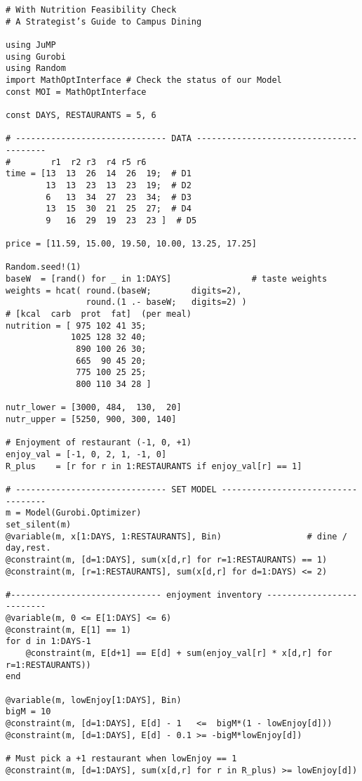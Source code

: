 \fontsize{10}{10}\selectfont

\begin{verbatim}
# With Nutrition Feasibility Check
# A Strategist’s Guide to Campus Dining

using JuMP
using Gurobi
using Random
import MathOptInterface # Check the status of our Model
const MOI = MathOptInterface

const DAYS, RESTAURANTS = 5, 6

# ------------------------------ DATA ----------------------------------------
#        r1  r2 r3  r4 r5 r6
time = [13  13  26  14  26  19;  # D1
        13  13  23  13  23  19;  # D2
        6   13  34  27  23  34;  # D3  
        13  15  30  21  25  27;  # D4
        9   16  29  19  23  23 ]  # D5  

price = [11.59, 15.00, 19.50, 10.00, 13.25, 17.25]

Random.seed!(1)
baseW  = [rand() for _ in 1:DAYS]                # taste weights
weights = hcat( round.(baseW;        digits=2),
                round.(1 .- baseW;   digits=2) )
# [kcal  carb  prot  fat]  (per meal)
nutrition = [ 975 102 41 35;
             1025 128 32 40;
              890 100 26 30;
              665  90 45 20;
              775 100 25 25;
              800 110 34 28 ]

nutr_lower = [3000, 484,  130,  20]        
nutr_upper = [5250, 900, 300, 140]  

# Enjoyment of restaurant (‑1, 0, +1)
enjoy_val = [-1, 0, 2, 1, -1, 0]
R_plus    = [r for r in 1:RESTAURANTS if enjoy_val[r] == 1]

# ------------------------------ SET MODEL ----------------------------------- 
m = Model(Gurobi.Optimizer)
set_silent(m)
@variable(m, x[1:DAYS, 1:RESTAURANTS], Bin)                 # dine / day,rest.
@constraint(m, [d=1:DAYS], sum(x[d,r] for r=1:RESTAURANTS) == 1)
@constraint(m, [r=1:RESTAURANTS], sum(x[d,r] for d=1:DAYS) <= 2)

#------------------------------ enjoyment inventory --------------------------
@variable(m, 0 <= E[1:DAYS] <= 6)
@constraint(m, E[1] == 1)
for d in 1:DAYS-1
    @constraint(m, E[d+1] == E[d] + sum(enjoy_val[r] * x[d,r] for r=1:RESTAURANTS))
end

@variable(m, lowEnjoy[1:DAYS], Bin)
bigM = 10
@constraint(m, [d=1:DAYS], E[d] - 1   <=  bigM*(1 - lowEnjoy[d]))
@constraint(m, [d=1:DAYS], E[d] - 0.1 >= -bigM*lowEnjoy[d])

# Must pick a +1 restaurant when lowEnjoy == 1
@constraint(m, [d=1:DAYS], sum(x[d,r] for r in R_plus) >= lowEnjoy[d])


\end{verbatim}
